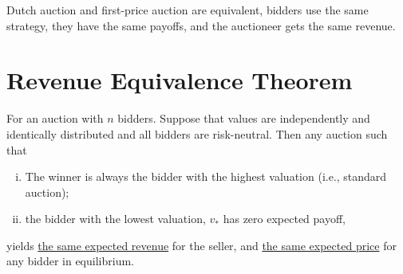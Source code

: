 \documentclass{article}
\begin{document}
	\begin{remark}
		Dutch auction and first-price auction are equivalent, bidders use the same strategy, they have the same payoffs, and the auctioneer gets the same revenue.
	\end{remark}
	
	\section{Revenue Equivalence Theorem}
	\begin{theorem}
		For an auction with $n$ bidders. Suppose that values are independently and identically distributed and all bidders are risk-neutral. Then any auction such that
		\begin{enumerate}[(i)]
			\item The winner is always the bidder with the highest valuation (i.e., standard auction);
			\item the bidder with the lowest valuation, $v_*$ has zero expected payoff,
		\end{enumerate}
		yields \ul{the same expected revenue} for the seller, and \ul{the same expected price} for any bidder in equilibrium.
	\end{theorem}
	
\end{document}
